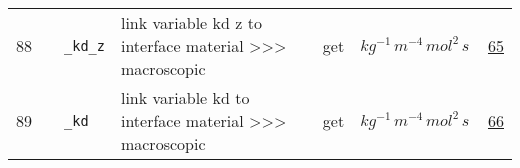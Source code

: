 \begin{longtable}{|p{1cm}|p{2.5cm}|p{4.5cm}|p{8cm}|p{3.0cm}|p{3cm}|p{1cm}|}
                 \\
        88
             & \hypertarget{"v:88"}{ $ {} $}
             & \verb|_kd_z|
             & link variable kd z to interface material >>> macroscopic
             & \begin{lay}get \end{lay}
             & $ kg^{-1} \,m^{-4} \,mol^{2} \,s \, $
             &                 \hyperlink{"e:65"}{ 65 }
                 \\
        89
             & \hypertarget{"v:89"}{ $ {} $}
             & \verb|_kd|
             & link variable kd to interface material >>> macroscopic
             & \begin{lay}get \end{lay}
             & $ kg^{-1} \,m^{-4} \,mol^{2} \,s \, $
             &                 \hyperlink{"e:66"}{ 66 }
                 \\
    \end{longtable}
